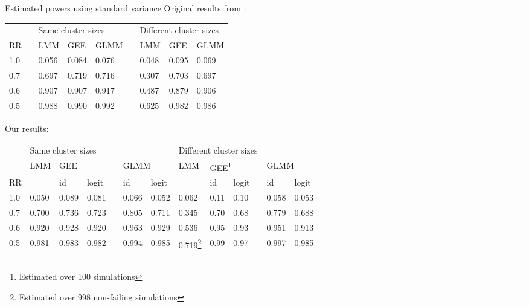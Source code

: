 \documentclass[9pt]{beamer}
\begin{document}
\begin{frame}{Estimated powers using standard variance}
Original results from \citet{Hussey:2007}:
\begin{table}[h]
\small
\centering
\begin{tabular}{@{}lclllclll@{}}
\toprule
&& \multicolumn{3}{l}{Same cluster sizes} && \multicolumn{3}{l}{Different cluster sizes} \\
\cmidrule{3-5}\cmidrule{7-9}
RR & & LMM & GEE & GLMM && LMM & GEE & GLMM \\
\midrule
1.0 &&  0.056 & 0.084 & 0.076 && 0.048 & 0.095 & 0.069 \\
0.7 && 0.697 & 0.719 & 0.716 && 0.307 & 0.703 & 0.697 \\
0.6 && 0.907 & 0.907 & 0.917 && 0.487 & 0.879 & 0.906 \\
0.5 && 0.988 & 0.990 & 0.992 && 0.625 & 0.982 & 0.986 \\
\bottomrule
\end{tabular}
\end{table}
Our results:
\begin{table}[h]
\small
\centering
\begin{tabular}{@{}llllcll|lllcll@{}}
\toprule
 & \multicolumn{6}{l|}{Same cluster sizes} & \multicolumn{6}{l}{Different cluster sizes} \\
\cmidrule{2-7}\cmidrule{8-13}
& LMM & \multicolumn{2}{l}{GEE} && \multicolumn{2}{l|}{GLMM} & LMM & \multicolumn{2}{l}{GEE\footnote{Estimated over 100 simulations}} && \multicolumn{2}{l}{GLMM} \\
\cmidrule{3-4}\cmidrule{6-7}\cmidrule{9-10}\cmidrule{12-13}
 RR & & id & logit && id & logit & & id & logit && id & logit \\
\midrule
1.0 &  0.050 & 0.089 & 0.081 && 0.066 & 0.052 & 0.062 & 0.11 & 0.10 && 0.058 & 0.053 \\
0.7 & 0.700 & 0.736 & 0.723 && 0.805 & 0.711 & 0.345 & 0.70 & 0.68 && 0.779 & 0.688 \\
0.6 & 0.920 & 0.928 & 0.920 && 0.963 & 0.929 & 0.536 & 0.95 & 0.93 && 0.951 & 0.913 \\
0.5 & 0.981 & 0.983 & 0.982 && 0.994 & 0.985 & 0.719\footnote{Estimated over 998 non-failing simulations} & 0.99 & 0.97 && 0.997 & 0.985 \\
\bottomrule
\end{tabular}
\end{table}
\end{frame}
\end{document}
